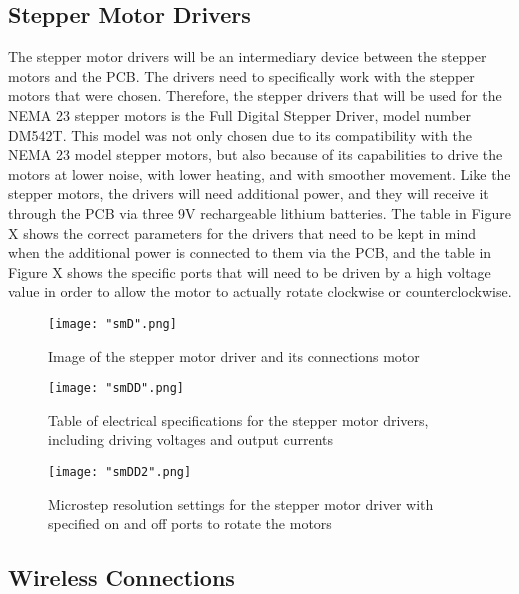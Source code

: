 \subsection{Stepper Motor Drivers} 
The stepper motor drivers will be an intermediary device between the stepper motors and the PCB. The drivers need to specifically work with the stepper motors that were chosen. Therefore, the stepper drivers that will be used for the NEMA 23 stepper motors is the Full Digital Stepper Driver, model number DM542T. This model was not only chosen due to its compatibility with the NEMA 23 model stepper motors, but also because of its capabilities to drive the motors at lower noise, with lower heating, and with smoother movement. Like the stepper motors, the drivers will need additional power, and they will receive it through the PCB via three 9V rechargeable lithium batteries.
The table in Figure X shows the correct parameters for the drivers that need to be kept in mind when the additional power is connected to them via the PCB, and the table in Figure X shows the specific ports that will need to be driven by a high voltage value in order to allow the motor to actually rotate clockwise or counterclockwise.

\begin{figure}[H]
	\centering
	{\texttt{[image: "smD".png]}}
	\caption{Image of the stepper motor driver and its connections
		 motor\cite{smdataR}}
	\label{fig:smD}
\end{figure}

\begin{figure}[H]
	\centering
	{\texttt{[image: "smDD".png]}}
	\caption{Table of electrical specifications for the stepper motor drivers, including driving voltages and output currents
		\cite{smdataR}}
	\label{fig:smDD}
\end{figure}

\begin{figure}[H]
	\centering
	{\texttt{[image: "smDD2".png]}}
	\caption{ Microstep resolution settings for the stepper motor driver with specified on and off ports to rotate the motors
		\cite{smdataR}}
	\label{fig:smDD2}
\end{figure}

\subsection{Wireless Connections}

